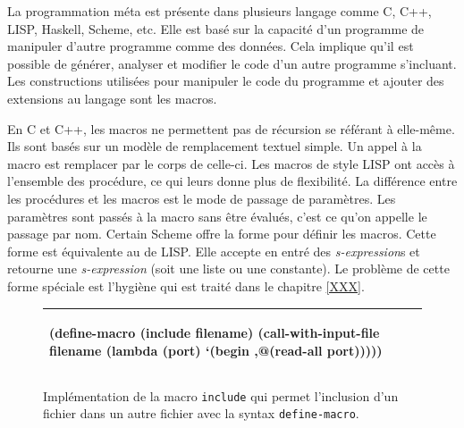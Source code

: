 


La programmation méta est présente dans plusieurs langage comme C, C++, LISP,
Haskell, Scheme, etc. Elle est basé sur la capacité d'un programme de manipuler
d'autre programme comme des données. Cela implique qu'il est possible de
générer, analyser et modifier le code d'un autre programme s'incluant.  Les
constructions utilisées pour manipuler le code du programme et
ajouter des extensions au langage sont les macros.

En C et C++, les macros ne permettent pas de récursion se référant à elle-même.
Ils sont basés sur un modèle de remplacement textuel simple. Un appel à la
macro est remplacer par le corps de celle-ci. Les macros de style LISP ont
accès à l'ensemble des procédure, ce qui leurs donne plus de flexibilité.  La
différence entre les procédures et les macros est le mode de passage de
paramètres.  Les paramètres sont passés à la macro sans être évalués, c'est ce
qu'on appelle le passage par nom.  Certain Scheme offre la forme
 pour définir les macros.  Cette forme est équivalente au
 de LISP. Elle accepte en entré des \textit{s-expression}s et
retourne une \textit{s-expression} (soit une liste ou une constante).  Le
problème de cette forme spéciale est l'hygiène qui est traité dans le chapitre
\ref{XXX}.

\begin{figure}[htbp]
  \begin{tabular}{|l|}\hline
\begin{mplisting}{0.7}
(define-macro (include filename)
  (call-with-input-file
    filename
    (lambda (port)
      `(begin
        ,@(read-all port)))))
\end{mplisting}\\\hline
\end{tabular}

  \caption{Implémentation de la macro \texttt{include} qui permet l'inclusion
  d'un fichier dans un autre fichier avec la syntax \texttt{define-macro}.}

  \label{fig:macro_include}
\end{figure}

